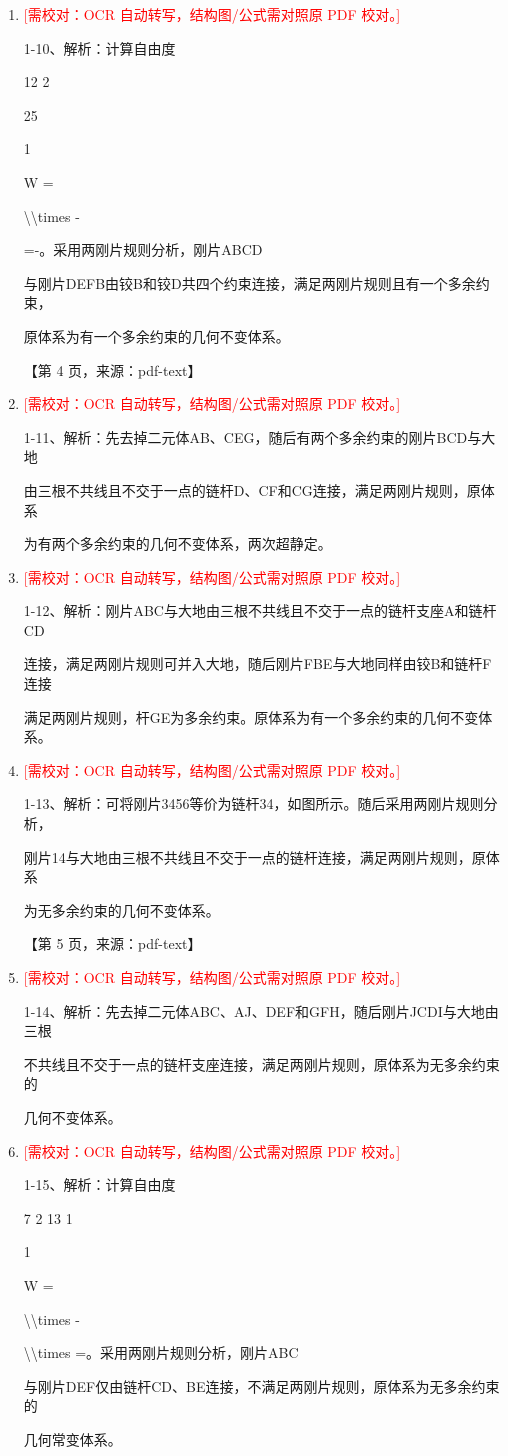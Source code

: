 \documentclass[UTF8,12pt,a4paper,openany]{ctexbook}
\newcommand{\TODO}[1]{\textcolor{red}{[需校对：#1]}}
\begin{document}
\begin{enumerate}[label=\textbf{\arabic*.},leftmargin=2em]
\item \TODO{OCR 自动转写，结构图/公式需对照原 PDF 校对。}\par 1-10、解析：计算自由度\par 12 2\par 25\par 1\par W =\par \textbackslash{}\textbackslash{}times -\par =-。采用两刚片规则分析，刚片ABCD\par 与刚片DEFB由铰B和铰D共四个约束连接，满足两刚片规则且有一个多余约束，\par 原体系为有一个多余约束的几何不变体系。\par \par 【第 4 页，来源：pdf-text】
\item \TODO{OCR 自动转写，结构图/公式需对照原 PDF 校对。}\par 1-11、解析：先去掉二元体AB、CEG，随后有两个多余约束的刚片BCD与大地\par 由三根不共线且不交于一点的链杆D、CF和CG连接，满足两刚片规则，原体系\par 为有两个多余约束的几何不变体系，两次超静定。
\item \TODO{OCR 自动转写，结构图/公式需对照原 PDF 校对。}\par 1-12、解析：刚片ABC与大地由三根不共线且不交于一点的链杆支座A和链杆CD\par 连接，满足两刚片规则可并入大地，随后刚片FBE与大地同样由铰B和链杆F连接\par 满足两刚片规则，杆GE为多余约束。原体系为有一个多余约束的几何不变体系。
\item \TODO{OCR 自动转写，结构图/公式需对照原 PDF 校对。}\par 1-13、解析：可将刚片3456等价为链杆34，如图所示。随后采用两刚片规则分析，\par 刚片14与大地由三根不共线且不交于一点的链杆连接，满足两刚片规则，原体系\par 为无多余约束的几何不变体系。\par \par 【第 5 页，来源：pdf-text】
\item \TODO{OCR 自动转写，结构图/公式需对照原 PDF 校对。}\par 1-14、解析：先去掉二元体ABC、AJ、DEF和GFH，随后刚片JCDI与大地由三根\par 不共线且不交于一点的链杆支座连接，满足两刚片规则，原体系为无多余约束的\par 几何不变体系。
\item \TODO{OCR 自动转写，结构图/公式需对照原 PDF 校对。}\par 1-15、解析：计算自由度\par 7 2 13 1\par 1\par W =\par \textbackslash{}\textbackslash{}times -\par \textbackslash{}\textbackslash{}times =。采用两刚片规则分析，刚片ABC\par 与刚片DEF仅由链杆CD、BE连接，不满足两刚片规则，原体系为无多余约束的\par 几何常变体系。

\end{enumerate}
\end{document}
